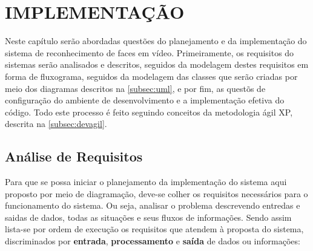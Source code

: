 
\chapter{IMPLEMENTAÇÃO}\label{ch:implementacao}

Neste capítulo serão abordadas questões do planejamento e da implementação do sistema de reconhecimento de faces em vídeo. Primeiramente, os requisitos do sistemas serão analisados e descritos, seguidos da modelagem destes requisitos em forma de fluxograma, seguidos da modelagem das classes que serão criadas por meio dos diagramas descritos na \autoref{subsec:uml}, e por fim, as questõs de configuração do ambiente de desenvolvimento e a implementação efetiva do código. Todo este processo é feito seguindo conceitos da metodologia ágil XP, descrita na \autoref{subsec:devagil}.

\section{Análise de Requisitos}\label{sec:analiserec}
Para que se possa iniciar o planejamento da implementação do sistema aqui proposto por meio de diagramação, deve-se colher os requisitos necessários para o funcionamento do sistema. Ou seja, analisar o problema descrevendo entredas e saidas de dados, todas as situações e seus fluxos de informações. Sendo assim lista-se por ordem de execução os requisitos que atendem à proposta do sistema, discriminados por \textbf{entrada}, \textbf{processamento} e \textbf{saída} de dados ou informações:

